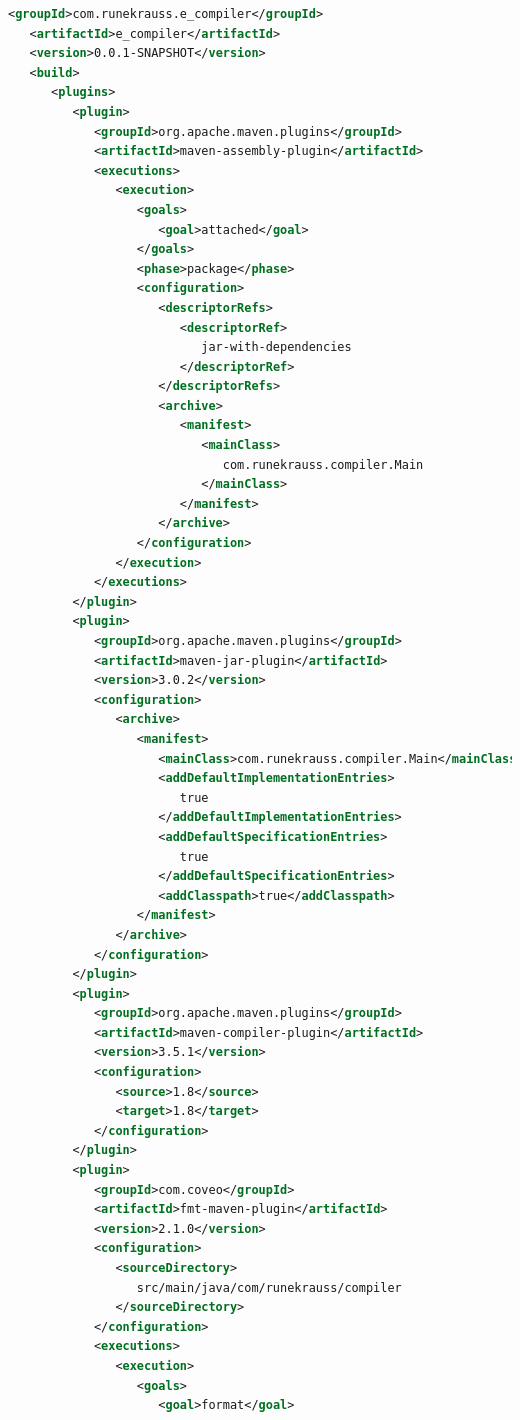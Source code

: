 \begin{lstlisting}[language=XML, frame=htrbl, caption={Implementation of {\ttfamily pom.xml}}, label={lst:maven}, basicstyle=\footnotesize]
   <groupId>com.runekrauss.e_compiler</groupId>
   <artifactId>e_compiler</artifactId>
   <version>0.0.1-SNAPSHOT</version>
   <build>
      <plugins>
         <plugin>
            <groupId>org.apache.maven.plugins</groupId>
            <artifactId>maven-assembly-plugin</artifactId>
            <executions>
               <execution>
                  <goals>
                     <goal>attached</goal>
                  </goals>
                  <phase>package</phase>
                  <configuration>
                     <descriptorRefs>
                        <descriptorRef>
                           jar-with-dependencies
                        </descriptorRef>
                     </descriptorRefs>
                     <archive>
                        <manifest>
                           <mainClass>
                              com.runekrauss.compiler.Main
                           </mainClass>
                        </manifest>
                     </archive>
                  </configuration>
               </execution>
            </executions>
         </plugin>
         <plugin>
            <groupId>org.apache.maven.plugins</groupId>
            <artifactId>maven-jar-plugin</artifactId>
            <version>3.0.2</version>
            <configuration>
               <archive>
                  <manifest>
                     <mainClass>com.runekrauss.compiler.Main</mainClass>
                     <addDefaultImplementationEntries>
                        true
                     </addDefaultImplementationEntries>
                     <addDefaultSpecificationEntries>
                        true
                     </addDefaultSpecificationEntries>
                     <addClasspath>true</addClasspath>
                  </manifest>
               </archive>
            </configuration>
         </plugin>
         <plugin>
            <groupId>org.apache.maven.plugins</groupId>
            <artifactId>maven-compiler-plugin</artifactId>
            <version>3.5.1</version>
            <configuration>
               <source>1.8</source>
               <target>1.8</target>
            </configuration>
         </plugin>
         <plugin>
            <groupId>com.coveo</groupId>
            <artifactId>fmt-maven-plugin</artifactId>
            <version>2.1.0</version>
            <configuration>
               <sourceDirectory>
                  src/main/java/com/runekrauss/compiler
               </sourceDirectory>
            </configuration>
            <executions>
               <execution>
                  <goals>
                     <goal>format</goal>

\end{lstlisting}
